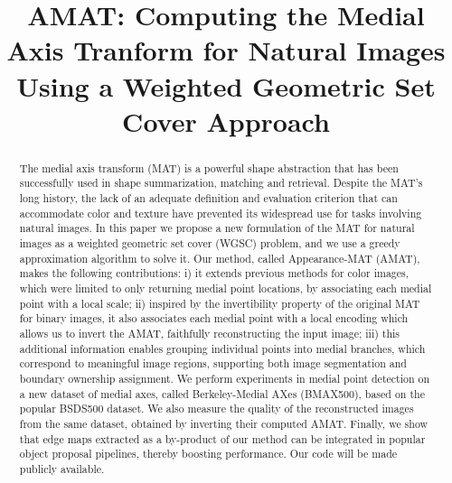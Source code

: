 \documentclass[10pt,twocolumn,letterpaper]{article}
\begin{document}
\title{AMAT: Computing the Medial Axis Tranform for Natural Images Using a Weighted Geometric Set Cover Approach}
\maketitle


\begin{abstract}
The medial axis transform (MAT) is a powerful shape abstraction that has been successfully
used in shape summarization, matching and retrieval. 
Despite the MAT's long history, the lack of an adequate definition and evaluation criterion 
that can accommodate color and texture have prevented its widespread use for tasks involving natural images.
In this paper we propose a new formulation of the
MAT for natural images as a weighted geometric set cover (WGSC) problem, and we use a greedy 
approximation algorithm to solve it.
Our method, called Appearance-MAT (AMAT), makes the following contributions: 
i) it extends previous methods for color images, which were limited to only returning medial point locations, 
by associating  each medial point with a local scale; 
ii) inspired by the invertibility property of the 
original MAT for binary images, it also associates each medial point with a local encoding
which allows us to invert the AMAT, faithfully reconstructing the input image; 
iii) this additional information enables grouping individual points into medial branches,
which correspond to meaningful image regions, supporting both image segmentation and boundary
ownership assignment.
We perform experiments in medial point detection on a new dataset of medial axes, called
Berkeley-Medial AXes (BMAX500), based on the popular BSDS500 dataset.
We also measure the quality of the reconstructed images from the same dataset,
obtained by inverting their computed AMAT. 
Finally, we show that edge maps extracted as a by-product of our method
can be integrated in popular object proposal pipelines, thereby boosting performance.
Our code will be made publicly available.
\end{abstract}



\end{document}
